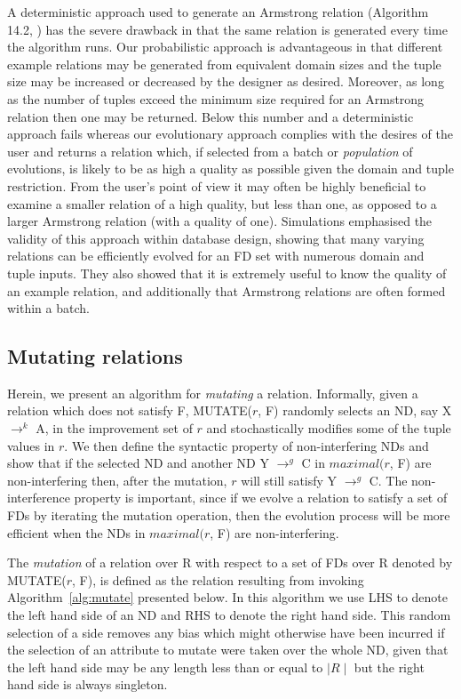 A deterministic approach used to generate an Armstrong relation
(Algorithm 14.2, \cite{Mann92}) has the severe drawback
 in that the same relation
is generated every time the algorithm runs.  Our probabilistic
approach is advantageous in that different example relations may
be generated from equivalent domain sizes and the tuple size may be
increased or decreased by the designer as desired. Moreover, as long as 
the number of tuples exceed the minimum size required for an Armstrong relation
 \cite{bdfs84,mr86} then one may
be returned.  Below this number and a deterministic approach fails
 whereas our evolutionary approach complies with the desires of the user
and returns a relation which, if selected from a batch or {\em 
population} of evolutions, is likely to be as high a quality
as possible given the domain and tuple restriction.  From the user's
point of view it may often be highly beneficial to examine a smaller
relation of a high quality, but less than one, as opposed to a larger Armstrong
relation (with a quality of one).
Simulations
emphasised the validity of this approach within database
design, showing that many varying relations can be efficiently
evolved for an FD set with numerous domain and tuple inputs.
 They also showed that it is extremely useful to know the quality of an
 example relation, and additionally that Armstrong
relations are often formed within a batch. 



\subsection{Mutating relations}
\label{sec:mutate}

Herein, we present an algorithm for {\em mutating} a relation.
Informally, given a relation which does not satisfy F, MUTATE($r$, F) 
randomly selects an ND, say X $\to^k$ A, in the improvement set of $r$ and 
stochastically modifies some of the tuple values in $r$.
We then define the syntactic property of non-interfering NDs 
and show that if the selected ND and another ND
Y $\to^g$ C in $maximal(r$, F) are non-interfering then, after the mutation, 
$r$ will still satisfy Y $\to^g$ C.
The non-interference property is important,
since if we evolve a relation to satisfy a set of FDs by iterating the
mutation operation, then the evolution process will be more efficient 
when the NDs in $maximal(r$, F) are non-interfering.

\medskip

The {\em mutation} of a relation over R with respect to a set of FDs over R 
denoted by MUTATE($r$, F), is defined as the relation resulting from invoking 
Algorithm~\ref{alg:mutate} presented below. In this algorithm we use LHS
 to denote the left hand side of an ND and RHS to denote the right hand
side.  This random selection of a side removes any bias which might otherwise
have been incurred if the selection of an attribute to mutate were
taken over the whole ND, given that the left hand side may be any
length less than or equal to $\mid R \mid$ but the right hand side is always singleton.



